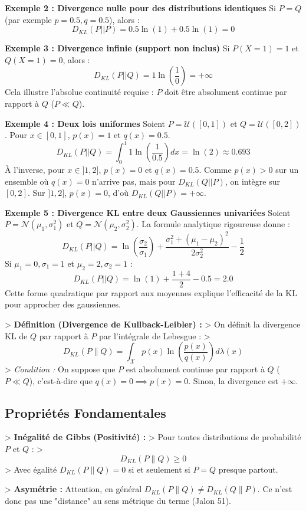 \documentclass[11pt,a4paper]{article}
\begin{document}
\textbf{Exemple 2 : Divergence nulle pour des distributions identiques}
Si $P = Q$ (par exemple $p = 0.5, q = 0.5$), alors :
$$ D_{KL}(P || P) = 0.5 \ln(1) + 0.5 \ln(1) = 0 $$

\textbf{Exemple 3 : Divergence infinie (support non inclus)}
Si $P(X=1) = 1$ et $Q(X=1) = 0$, alors :
$$ D_{KL}(P || Q) = 1 \ln\left(\frac{1}{0}\right) = +\infty $$
Cela illustre l'absolue continuité requise : $P$ doit être absolument continue par rapport à $Q$ ($P \ll Q$).

\textbf{Exemple 4 : Deux lois uniformes}
Soient $P = \mathcal{U}([0, 1])$ et $Q = \mathcal{U}([0, 2])$.
Pour $x \in [0, 1]$, $p(x) = 1$ et $q(x) = 0.5$.
$$ D_{KL}(P || Q) = \int_{0}^{1} 1 \ln\left(\frac{1}{0.5}\right) dx = \ln(2) \approx 0.693 $$
À l'inverse, pour $x \in ]1, 2]$, $p(x) = 0$ et $q(x) = 0.5$. Comme $p(x)>0$ sur un ensemble où $q(x)=0$ n'arrive pas, mais pour $D_{KL}(Q || P)$, on intègre sur $[0, 2]$. Sur $]1, 2]$, $p(x) = 0$, d'où $D_{KL}(Q || P) = +\infty$.

\textbf{Exemple 5 : Divergence KL entre deux Gaussiennes univariées}
Soient $P = \mathcal{N}(\mu_1, \sigma_1^2)$ et $Q = \mathcal{N}(\mu_2, \sigma_2^2)$.
La formule analytique rigoureuse donne :
$$ D_{KL}(P || Q) = \ln\left(\frac{\sigma_2}{\sigma_1}\right) + \frac{\sigma_1^2 + (\mu_1 - \mu_2)^2}{2\sigma_2^2} - \frac{1}{2} $$
Si $\mu_1 = 0, \sigma_1 = 1$ et $\mu_2 = 2, \sigma_2 = 1$ :
$$ D_{KL}(P || Q) = \ln(1) + \frac{1 + 4}{2} - 0.5 = 2.0 $$
Cette forme quadratique par rapport aux moyennes explique l'efficacité de la KL pour approcher des gaussiennes.


> \textbf{Définition (Divergence de Kullback-Leibler) :}
> On définit la divergence KL de $Q$ par rapport à $P$ par l'intégrale de Lebesgue :
> $$D_{KL}(P \| Q) = \int_{\mathcal{X}} p(x) \ln\left( \frac{p(x)}{q(x)} \right) d\lambda(x)$$
> \textit{Condition :} On suppose que $P$ est absolument continue par rapport à $Q$ ($P \ll Q$), c'est-à-dire que $q(x)=0 \implies p(x)=0$. Sinon, la divergence est $+\infty$.

\subsection{Propriétés Fondamentales}

> \textbf{Inégalité de Gibbs (Positivité) :}
> Pour toutes distributions de probabilité $P$ et $Q$ :
> $$D_{KL}(P \| Q) \ge 0$$
> Avec égalité $D_{KL}(P \| Q) = 0$ si et seulement si $P = Q$ presque partout.

> \textbf{Asymétrie :} Attention, en général $D_{KL}(P \| Q) \neq D_{KL}(Q \| P)$. Ce n'est donc pas une "distance" au sens métrique du terme (Jalon 51).
\end{document}
